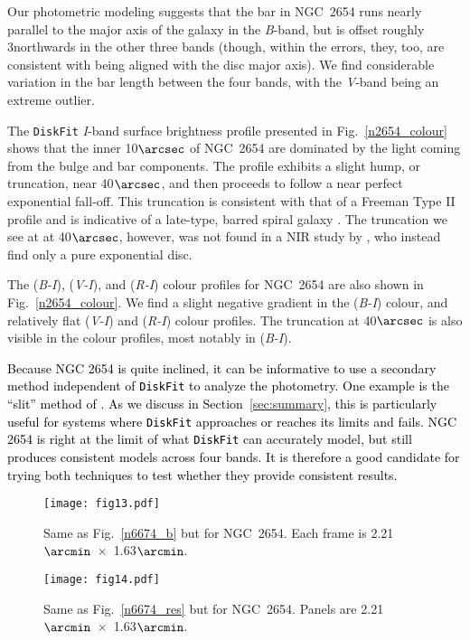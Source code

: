 \documentclass[a4paper,fleqn,usenatbib]{mnras}
\newcommand{\authorfix}{\textcolor{black}}
\begin{document}
Our photometric modeling suggests that the bar in NGC~2654 runs nearly parallel to the major axis of the galaxy in the \textit{B}-band, but is offset roughly 3\degr northwards in the other three bands (though, within the errors, they, too, are consistent with being aligned with the disc major axis). We find considerable variation in the bar length between the four bands, with the \textit{V}-band being an extreme outlier. 

The \texttt{DiskFit} \textit{I}-band surface brightness profile presented in Fig.~\ref{n2654_colour} shows that the inner 10$\arcsec$ of NGC~2654 are dominated by the light coming from the bulge and bar components. The profile exhibits a slight hump, or truncation, near 40$\arcsec$, and then proceeds to follow a near perfect exponential fall-off. This truncation is consistent with that of a Freeman Type II profile and is indicative of a late-type, barred spiral galaxy \citep{erwin2008, guitierrez2011}. The truncation we see at at 40$\arcsec$, however, was not found in a NIR study by \citet{florido2006}, who instead find only a pure exponential disc. 

The (\textit{B-I}), (\textit{V-I}), and (\textit{R-I}) colour profiles for NGC~2654 are also shown in Fig.~\ref{n2654_colour}.  We find a slight negative gradient in the (\textit{B-I}) colour, and relatively flat (\textit{V-I}) and (\textit{R-I}) colour profiles. The truncation at 40$\arcsec$ is also visible in the colour profiles, most notably in (\textit{B-I}).

\authorfix{Because NGC 2654 is quite inclined, it can be informative to use a secondary method independent of \texttt{DiskFit} to analyze the photometry. One example is the ``slit'' method of \citet{kuzio2009}. As we discuss in Section~\ref{sec:summary}, this is particularly useful for systems where \texttt{DiskFit} approaches or reaches its limits and fails. NGC 2654 is right at the limit of what \texttt{DiskFit} can accurately model, but still produces consistent models across four bands. It is therefore a good candidate for trying both techniques to test whether they provide consistent results.}

\begin{figure*}
	\center
	\texttt{[image: fig13.pdf]}
  	\caption{Same as Fig.~\ref{n6674_b} but for NGC~2654. Each frame is 2.21$\arcmin$~$\times$~1.63$\arcmin$.}
  	\label{n2654_b}
\end{figure*}

\begin{figure}
	\center
	\texttt{[image: fig14.pdf]}
	\caption{Same as Fig.~\ref{n6674_res} but for NGC~2654. Panels are 2.21$\arcmin$~$\times$~1.63$\arcmin$.}
	\label{n2654_res}
\end{figure}
\end{document}

